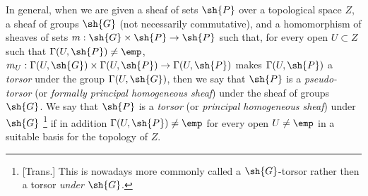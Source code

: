 \begin{env}[16.5.15]
\label{IV.16.5.15}
In general, when we are given a sheaf of sets $\sh{P}$ over a topological space $Z$, a sheaf of groups $\sh{G}$ (not necessarily commutative), and a homomorphism of sheaves of sets $m : \sh{G} \times \sh{P} \to \sh{P}$ such that, for every open $U \subset Z$ such that $\Gamma(U, \sh{P}) \neq \emp$, $m_U : \Gamma(U, \sh{G}) \times \Gamma(U, \sh{P}) \to \Gamma(U, \sh{P})$ makes $\Gamma(U, \sh{P})$ a \emph{torsor} under the group $\Gamma(U,\sh{G})$, then we say that $\sh{P}$ is a \emph{pseudo-torsor} (or \emph{formally principal homogeneous sheaf}) under the sheaf of groups $\sh{G}$.
We say that $\sh{P}$ is a \emph{torsor} (or \emph{principal homogeneous sheaf}) under $\sh{G}$
\footnote{
[Trans.] This is nowadays more commonly called a $\sh{G}$-torsor rather then a torsor \emph{under} $\sh{G}$.
}
if in addition $\Gamma(U, \sh{P}) \neq \emp$ for every open $U \neq \emp$ in a suitable basis for the topology of $Z$.


\end{env}

